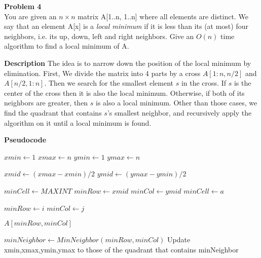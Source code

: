 \documentclass[12pt,article]{article}
\newenvironment{problem}[2][Problem]
    { \begin{mdframed}[backgroundcolor=gray!20] \textbf{#1 #2} \\}
    {  \end{mdframed}}
\begin{document}
\newpage
\begin{problem}{4} 
You are given an $n \times n$ matrix A[1..n, 1..n] where all elements are distinct. We say that an element A[x] is a \textit{local minimum} if it is less than its (at most) four neighbors, i.e. its up, down, left and right neighbors. Give an $O(n)$ time algorithm to find a local minimum of A.
\end{problem}

\textbf{Description}
The idea is to narrow down the position of the local minimum by elimination. First, We divide the matrix into 4 parts by a cross $A[1:n, n/2]$ and $A[n/2, 1:n]$. Then we search for the smallest element $s$ in the cross. If $s$ is the center of the cross then it is also the local minimum. Otherwise, if both of its neighbors are greater, then $s$ is also a local minimum. Other than those cases, we find the quadrant that contains $s$'s smallest neighbor, and recursively apply the algorithm on it until a local minimum is found.

\textbf{Pseudocode}

\begin{algorithm}
\caption{$LM(A[1:n,1:n]),k$}\label{alg:q4}
\begin{algorithmic}
    \State $xmin \gets 1$
    \State $xmax \gets n$
    \State $ymin \gets 1$
    \State $ymax \gets n$
    
        \State $xmid \gets (xmax - xmin) / 2$
        \State $ymid \gets (ymax - ymin) / 2$

        \State $minCell \gets MAXINT$
        \State $minRow \gets xmid$
        \State $minCol \gets ymid$
                \State $minCell \gets a$

                \State $minRow \gets i$
                \State $minCol \gets j$
            \EndIf
        \EndFor

            \Return $A[minRow,minCol]$
        \EndIf

        \State $minNeighbor \gets MinNeighbor(minRow,minCol)$
        \State Update xmin,xmax,ymin,ymax to those of the quadrant that contains minNeighbor

    \EndWhile
\end{algorithmic}
\end{algorithm}
\end{document}
